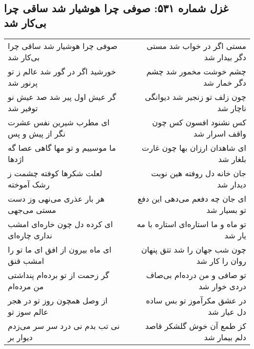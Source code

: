 \begin{center}
\section*{غزل شماره ۵۳۱: صوفی چرا هوشیار شد ساقی چرا بی‌کار شد}
\label{sec:0531}
\begin{longtable}{l p{0.5cm} r}
صوفی چرا هوشیار شد ساقی چرا بی‌کار شد
&&
مستی اگر در خواب شد مستی دگر بیدار شد
\\
خورشید اگر در گور شد عالم ز تو پرنور شد
&&
چشم خوشت مخمور شد چشم دگر خمار شد
\\
گر عیش اول پیر شد صد عیش نو توفیر شد
&&
چون زلف تو زنجیر شد دیوانگی ناچار شد
\\
ای مطرب شیرین نفس عشرت نگر از پیش و پس
&&
کس نشنود افسون کس چون واقف اسرار شد
\\
ما موسییم و تو مها گاهی عصا گه اژدها
&&
ای شاهدان ارزان بها چون غارت بلغار شد
\\
لعلت شکرها کوفته چشمت ز رشک آموخته
&&
جان خانه دل روفته هین نوبت دیدار شد
\\
هر بار عذری می‌نهی وز دست مستی می‌جهی
&&
ای جان چه دفعم می‌دهی این دفع تو بسیار شد
\\
ای کرده دل چون خاره‌ای امشب نداری چاره‌ای
&&
تو ماه و ما استاره‌ای استاره با مه یار شد
\\
ای ماه بیرون از افق ای ما تو را امشب قنق
&&
چون شب جهان را شد تتق پنهان روان را کار شد
\\
گر زحمت از تو برده‌ام پنداشتی من مرده‌ام
&&
تو صافی و من درده‌ام بی‌صاف دردی خوار شد
\\
از وصل همچون روز تو در هجر عالم سوز تو
&&
در عشق مکرآموز تو بس ساده دل عیار شد
\\
نی تب بدم نی درد سر سر می‌زدم دیوار بر
&&
کز طمع آن خوش گلشکر قاصد دلم بیمار شد
\\
\end{longtable}
\end{center}

